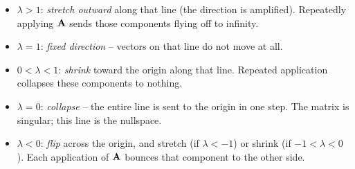 \begin{itemize}
  \item $\lambda>1$: \emph{stretch outward} along that line (the direction is
        amplified). Repeatedly applying $\mathbf{A}$ sends those components flying
        off to infinity.
  \item $\lambda=1$: \emph{fixed direction} -- vectors on that line do not move at
        all.
  \item $0<\lambda<1$: \emph{shrink} toward the origin along that line. Repeated
        application collapses these components to nothing.
  \item $\lambda=0$: \emph{collapse} -- the entire line is sent to the origin in
        one step. The matrix is singular; this line is the nullspace.
  \item $\lambda<0$: \emph{flip} across the origin, and stretch (if
        $\lambda<-1$) or shrink (if $-1<\lambda<0$). Each application of $\mathbf{A}$
        bounces that component to the other side.
\end{itemize}

